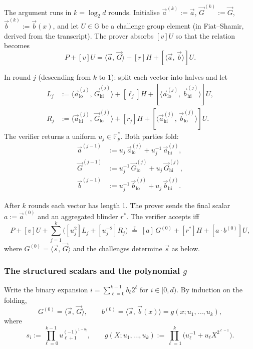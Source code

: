 \documentclass[11pt,a4paper]{article}
\theoremstyle{definition}
\newcommand{\F}{\mathbb{F}}
\newcommand{\G}{\mathbb{G}}
\newcommand{\ip}[2]{\langle #1,\, #2 \rangle}
\begin{document}
The argument runs in $k = \log_2 d$ rounds. Initialise
$\vec{a}^{(k)} := \vec{a}$, $\vec{G}^{(k)} := \vec{G}$,
$\vec{b}^{(k)} := \vec{b}(x)$, and let $U \in \G$ be a challenge group
element (in Fiat--Shamir, derived from the transcript). The prover
absorbs $[v]U$ so that the relation becomes
\[
P + [v] U = \ip{\vec{a}}{\vec{G}} + [r] H + [\ip{\vec{a}}{\vec{b}}] U.
\]

In round $j$ (descending from $k$ to $1$): split each vector into halves
and let
\begin{align*}
L_j &:= \ip{\vec{a}_{\mathrm{lo}}^{(j)}}{\vec{G}_{\mathrm{hi}}^{(j)}} + [\ell_j] H + [\ip{\vec{a}_{\mathrm{lo}}^{(j)}}{\vec{b}_{\mathrm{hi}}^{(j)}}] U,\\
R_j &:= \ip{\vec{a}_{\mathrm{hi}}^{(j)}}{\vec{G}_{\mathrm{lo}}^{(j)}} + [r_j] H + [\ip{\vec{a}_{\mathrm{hi}}^{(j)}}{\vec{b}_{\mathrm{lo}}^{(j)}}] U.
\end{align*}
The verifier returns a uniform $u_j \in \F_p^*$. Both parties fold:
\begin{align*}
\vec{a}^{(j-1)} &:= u_j\,\vec{a}_{\mathrm{lo}}^{(j)} + u_j^{-1}\,\vec{a}_{\mathrm{hi}}^{(j)},\\
\vec{G}^{(j-1)} &:= u_j^{-1}\,\vec{G}_{\mathrm{lo}}^{(j)} + u_j\,\vec{G}_{\mathrm{hi}}^{(j)},\\
\vec{b}^{(j-1)} &:= u_j^{-1}\,\vec{b}_{\mathrm{lo}}^{(j)} + u_j\,\vec{b}_{\mathrm{hi}}^{(j)}.
\end{align*}

After $k$ rounds each vector has length 1. The prover sends the final
scalar $a := \vec{a}^{(0)}$ and an aggregated blinder $r^*$. The verifier
accepts iff
\begin{equation}\label{eq:ipa-final}
P + [v] U + \sum_{j=1}^{k} \bigl([u_j^2] L_j + [u_j^{-2}] R_j\bigr)
\;\stackrel{?}{=}\; [a]\,G^{(0)} + [r^*] H + [a \cdot b^{(0)}] U,
\end{equation}
where $G^{(0)} = \ip{\vec{s}}{\vec{G}}$ and the challenges determine
$\vec{s}$ as below.

\subsubsection{The structured scalars and the polynomial $g$}\label{sec:gpoly}

Write the binary expansion $i = \sum_{\ell=0}^{k-1} b_\ell 2^\ell$ for
$i \in [0, d)$. By induction on the folding,
\[
G^{(0)} = \ip{\vec{s}}{\vec{G}}, \qquad b^{(0)} = \ip{\vec{s}}{\vec{b}(x)} = g(x; u_1, \dots, u_k),
\]
where
\[
s_i := \prod_{\ell=0}^{k-1} u_{\ell+1}^{(-1)^{1-b_\ell}}, \qquad
g(X; u_1, \dots, u_k) := \prod_{\ell=1}^{k} \bigl(u_\ell^{-1} + u_\ell X^{2^{\ell-1}}\bigr).
\]
\end{document}
